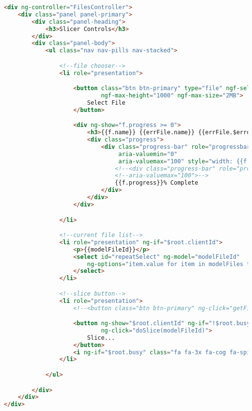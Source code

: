 \begin{lstlisting}[language=HTML, label={lst:filesTemplate}, caption=HTML snippet which controls the structure of the file upload dialog.]
<div ng-controller="FilesController">
    <div class="panel panel-primary">
        <div class="panel-heading">
            <h3>Slicer Controls</h3>
        </div>
        <div class="panel-body">
            <ul class="nav nav-pills nav-stacked">

                <!--file chooser-->
                <li role="presentation">

                    <button class="btn btn-primary" type="file" ngf-select="uploadFile($file,$invalidFiles)"
                            ngf-max-height="1000" ngf-max-size="2MB">
                        Select File
                    </button>

                    <div ng-show="f.progress >= 0">
                        <h3>{{f.name}} {{errFile.name}} {{errFile.$error}} {{errFile.$errorParam}}</h3>
                        <div class="progress">
                            <div class="progress-bar" role="progressbar" aria-valuenow="{{f.progress}}"
                                 aria-valuemin="0"
                                 aria-valuemax="100" style="width: {{f.progress}}%;">
                                <!--<div class="progress-bar" role="progressbar" aria-valuenow="{{f.progress}}" aria-valuemin="0"-->
                                <!--aria-valuemax="100">-->
                                {{f.progress}}% Complete
                            </div>
                        </div>
                    </div>

                </li>

                <!--current file list-->
                <li role="presentation" ng-if="$root.clientId">
                    <p>{{modelFileId}}</p>
                    <select id="repeatSelect" ng-model="modelFileId"
                        ng-options="item.value for item in modelFiles track by item.key">
                    </select>
                </li>

                <!--slice button-->
                <li role="presentation">
                    <!--<button class="btn btn-primary" ng-click="getFileList()">Refresh file list</button>-->

                    <button ng-show="$root.clientId" ng-if="!$root.busy" class="btn btn-primary"
                            ng-click="doSlice(modelFileId)">
                        Slice...
                    </button>
                    <i ng-if="$root.busy" class="fa fa-3x fa-cog fa-spin"></i>
                </li>

            </ul>

        </div>
    </div>
</div>
\end{lstlisting}

